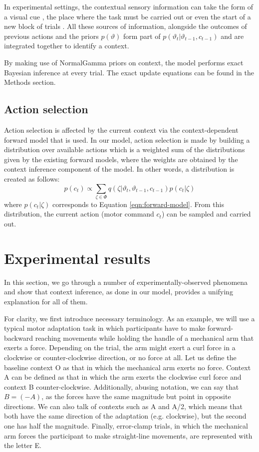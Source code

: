 \documentclass[a4paper,doc,floatsintext,natbib]{apa6}
\def \eref #1{Equation \ref{#1}}   %
\begin{document}
In experimental settings, the contextual sensory information can take the form of a visual cue \cite[e.g.][]{Lee_Dual_2009,Kim_Neural_2015}, the place where the task must be carried out \cite[e.g.][]{Forano_Timescales_2020,Shadmehr_Adaptive_1994} or even the start of a new block of trials \cite{Ethier_Spontaneous_2008}. All these sources of information, alongside the outcomes of previous actions and the priors $p(\vartheta)$ form part of $p(\vartheta_t | \vartheta_{t-1}, c_{t-1})$ and are integrated together to identify a context.

By making use of NormalGamma priors on context, the model performs exact Bayesian inference at every trial. The exact update equations can be found in the Methods section.

\subsection{Action selection}
Action selection is affected by the current context via the context-dependent forward model that is used. In our model, action selection is made by building a distribution over available actions which is a weighted sum of the distributions given by the existing forward models, where the weights are obtained by the context inference component of the model. In other words, a distribution is created as follows:
\begin{equation}
p(c_t) \propto \displaystyle\sum_{\zeta \in \Phi}q(\zeta | \vartheta_t, \vartheta_{t-1}, c_{t-1}) p(c_t | \zeta) \label{eq:action-selection}
\end{equation}
where $p(c_t | \zeta)$ corresponds to \eref{eqn:forward-model}. From this distribution, the current action (motor command $c_t$) can be sampled and carried out.

\section{Experimental results}
In this section, we go through a number of experimentally-observed phenomena and show that context inference, as done in our model, provides a unifying explanation for all of them.

For clarity, we first introduce necessary terminology. As an example, we will use a typical motor adaptation task in which participants have to make forward-backward reaching movements while holding the handle of a mechanical arm that exerts a force. Depending on the trial, the arm might exert a curl force in a clockwise or counter-clockwise direction, or no force at all. Let us define the baseline context O as that in which the mechanical arm exerts no force. Context A can be defined as that in which the arm exerts the clockwise curl force and context B counter-clockwise. Additionally, abusing notation, we can say that $B = (-A)$, as the forces have the same magnitude but point in opposite directions. We can also talk of contexts such as A and A/2, which means that both have the same direction of the adaptation (e.g. clockwise), but the second one has half the magnitude. Finally, error-clamp trials, in which the mechanical arm forces the participant to make straight-line movements, are represented with the letter E.
\end{document}

